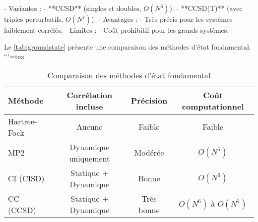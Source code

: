 \documentclass[12pt,a4paper]{report}
\begin{document}
\begin{markdown}
   - Variantes :
     - **CCSD** (singles et doubles, $O(N^6)$).
     - **CCSD(T)** (avec triples perturbatifs, $O(N^7)$).
   - Avantages :
     - Très précis pour les systèmes faiblement corrélés.
   - Limites :
     - Coût prohibitif pour les grands systèmes.

Le \autoref{tab:groundstate} présente une comparaison des méthodes d'état fondamental.
```{=tex}
\begin{table}[htpb]
\centering
\caption{Comparaison des méthodes d'état fondamental}
\begin{tabular}{@{}lccc@{}}
\toprule
\textbf{Méthode}       & \textbf{Corrélation incluse} & \textbf{Précision}  & \textbf{Coût computationnel} \\ \midrule
Hartree-Fock           & Aucune                      & Faible              & Faible                       \\
MP2                    & Dynamique uniquement        & Modérée             & $O(N^5)$                     \\
CI (CISD)              & Statique + Dynamique        & Bonne               & $O(N^6)$                     \\
CC (CCSD)              & Statique + Dynamique        & Très bonne          & $O(N^6)$ à $O(N^7)$          \\ \bottomrule
\end{tabular}
\label{tab:groundstate}
\end{table}


\end{markdown}
\end{document}
